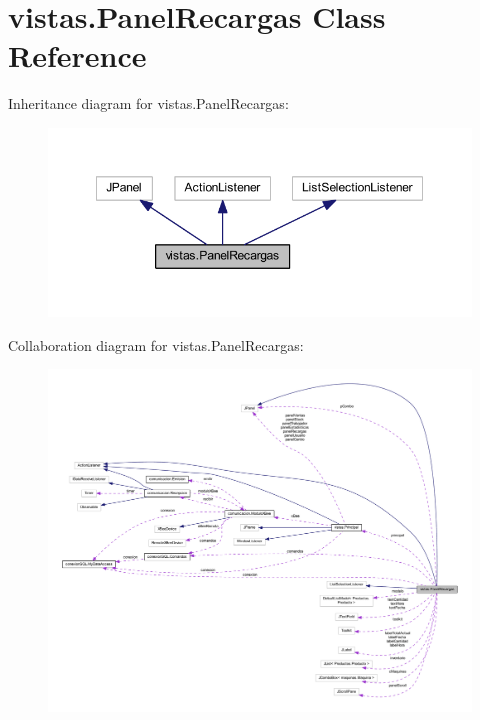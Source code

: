 \hypertarget{classvistas_1_1_panel_recargas}{}\section{vistas.\+Panel\+Recargas Class Reference}
\label{classvistas_1_1_panel_recargas}


Inheritance diagram for vistas.\+Panel\+Recargas\+:
\nopagebreak
\begin{figure}[H]
\begin{center}
\leavevmode
\includegraphics[width=349pt]{classvistas_1_1_panel_recargas__inherit__graph}
\end{center}
\end{figure}


Collaboration diagram for vistas.\+Panel\+Recargas\+:
\nopagebreak
\begin{figure}[H]
\begin{center}
\leavevmode
\includegraphics[width=350pt]{classvistas_1_1_panel_recargas__coll__graph}
\end{center}
\end{figure}
